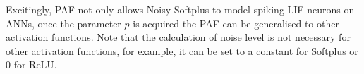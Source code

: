 \documentclass{article}
\begin{document}
	Excitingly, PAF not only allows Noisy Softplus to model spiking LIF neurons on ANNs, once the parameter $p$ is acquired the PAF can be generalised to other activation functions.
	Note that the calculation of noise level is not necessary for other activation functions, for example, it can be set to a constant for Softplus or 0 for ReLU.
	
\end{document}
